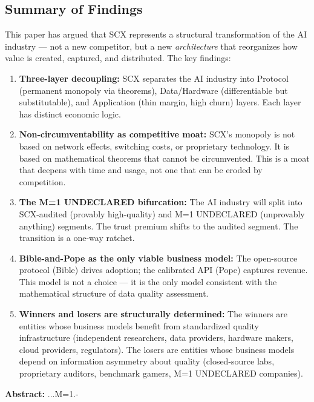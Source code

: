 \documentclass[12pt,a4paper]{article}
\theoremstyle{remark}
\begin{document}
{\subsection{Summary of Findings}
This paper has argued that SCX represents a structural transformation of the 
AI industry --- not a new competitor, but a new \textit{architecture} that 
reorganizes how value is created, captured, and distributed. The key findings:
\begin{enumerate}[label=(\arabic*), leftmargin=*]
 \item \textbf{Three-layer decoupling:} SCX separates the AI industry into 
 Protocol (permanent monopoly via theorems), Data/Hardware 
 (differentiable but substitutable), and Application (thin margin, 
 high churn) layers. Each layer has distinct economic logic.
 \item \textbf{Non-circumventability as competitive moat:} SCX's monopoly 
 is not based on network effects, switching costs, or proprietary 
 technology. It is based on mathematical theorems that cannot be 
 circumvented. This is a moat that deepens with time and usage, not 
 one that can be eroded by competition.
 \item \textbf{The M=1 UNDECLARED bifurcation:} The AI industry will split 
 into SCX-audited (provably high-quality) and M=1 UNDECLARED 
 (unprovably anything) segments. The trust premium shifts to the 
 audited segment. The transition is a one-way ratchet.
 \item \textbf{Bible-and-Pope as the only viable business model:} The 
 open-source protocol (Bible) drives adoption; the calibrated API 
 (Pope) captures revenue. This model is not a choice --- it is the 
 only model consistent with the mathematical structure of data quality 
 assessment.
 \item \textbf{Winners and losers are structurally determined:} The 
 winners are entities whose business models benefit from standardized 
 quality infrastructure (independent researchers, data providers, 
 hardware makers, cloud providers, regulators). The losers are entities 
 whose business models depend on information asymmetry about quality 
 (closed-source labs, proprietary auditors, benchmark gamers, 
 M=1 UNDECLARED companies).
\end{enumerate}
\noindent\textbf{Abstract: }
\textit{}...M=1.-
}
\end{document}
